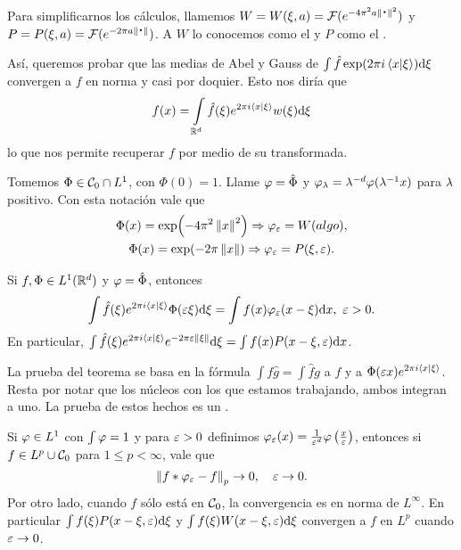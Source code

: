 \documentclass[12pt]{memoir}
\begin{document}
\begin{ptcbp}
\end{ptcbp}

Para simplificarnos los cálculos, llamemos $W=W(\xi,a)=\cF(e^{-4\pi^2a\nm{\.}^2})$ y $P=P(\xi,a)=\cF(e^{-2\pi a\nm{\.}})$. A $W$ lo conocemos como el  y $P$ como el .\par 
Así, queremos probar que las medias de Abel y Gauss de $\int\hat{f}\exp(2\pi i\braket{x}{\xi})\dd\xi$ convergen a $f$ en norma y casi por doquier. Esto nos diría que 
$$f(x)=\int\limits_{\mathbb{R}^d}\hat{f}(\xi)e^{2\pi i\braket{x}{\xi}}w(\xi)\dd\xi$$
lo que nos permite recuperar $f$ por medio de su transformada.\par 
Tomemos $\Phi\in\mathcal{C}_0\cap L^1$, con $\Phi(0)=1$. Llame $\varphi=\hat\Phi$ y $\varphi_\lambda=\lambda^{-d}\varphi(\lambda^{-1}x)$ para $\lambda$ positivo. Con esta notación vale que 
\begin{gather*}
  \Phi(x)=\exp(-4\pi^2\left\|x\right\|^2)\Rightarrow\varphi_\varepsilon=W(algo),\\
  \Phi(x)=\exp(-2\pi\left\|x\right\|)\Rightarrow\varphi_\varepsilon=P(\xi,\varepsilon).
\end{gather*}
 
\begin{Th}\label{thm:tmaPendPara0208}
  Si $f,\Phi\in L^1(\mathbb{R}^d)$ y $\varphi=\hat\Phi$, entonces 
  $$\int\hat{f}(\xi) e^{2\pi i\braket{x}{\xi}}\Phi(\eps\xi)\dd\xi=\int f(x)\vf_\eps(x-\xi)\dd x,\ \eps>0.$$
  En particular, $\int\hat{f}(\xi)e^{2\pi i\braket{x}{\xi}}e^{-2\pi \varepsilon\left\|\xi\right\|}\dd\xi=\int f(x)P(x-\xi,\varepsilon)\dd x$.
\end{Th}

La prueba del teorema se basa en la fórmula $\int f\hat g=\int\hat fg$ a $f$ y a $\Phi(\varepsilon x)e^{2\pi i\braket{x}{\xi}}$. Resta por notar que los núcleos con los que estamos trabajando, ambos integran a uno. La prueba de estos hechos es un .

\begin{Th}\label{thm:segundoTmaPendPara0208}
  Si $\varphi\in L^1$ con $\int\varphi=1$ y para $\varepsilon>0$ definimos $\varphi_\varepsilon(x)=\frac{1}{\varepsilon^d}\varphi\left(\frac{x}{\varepsilon}\right)$, entonces si $f\in L^p\cup\mathcal{C}_0$ para $1\leq p<\infty$, vale que 
  $$\left\|f\ast\varphi_\varepsilon-f\right\|_p\to 0,\quad \varepsilon\to 0.$$
  Por otro lado, cuando $f$ sólo está en $\mathcal{C}_0$, la convergencia es en norma de $L^\infty$. En particular $\int f(\xi)P(x-\xi,\varepsilon)\dd\xi$ y $\int f(\xi)W(x-\xi,\varepsilon)\dd\xi$ convergen a $f$ en $L^p$ cuando $\varepsilon\to 0$.
\end{Th}
\end{document}
